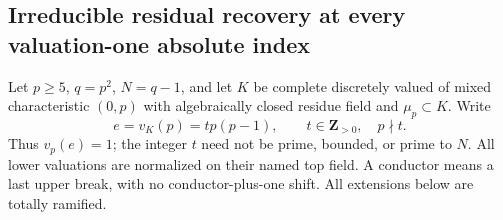 \subsection{Irreducible residual recovery at every valuation-one absolute index}

Let $p\ge5$, $q=p^2$, $N=q-1$, and let $K$ be complete
discretely valued of mixed characteristic $(0,p)$ with algebraically
closed residue field and $\mu_p\subset K$. Write
\[
 e=v_K(p)=tp(p-1),\qquad t\in\mathbf Z_{>0},\quad p\nmid t.
                                                        \tag{B-RD99.1}
\]
Thus $v_p(e)=1$; the integer $t$ need not be prime, bounded,
or prime to $N$. All lower valuations are normalized on their
named top field. A conductor means a last upper break, with no
conductor-plus-one shift. All extensions below are totally ramified.

